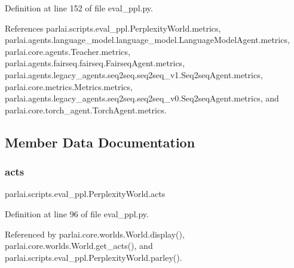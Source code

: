Definition at line 152 of file eval\+\_\+ppl.\+py.



References parlai.\+scripts.\+eval\+\_\+ppl.\+Perplexity\+World.\+metrics, parlai.\+agents.\+language\+\_\+model.\+language\+\_\+model.\+Language\+Model\+Agent.\+metrics, parlai.\+core.\+agents.\+Teacher.\+metrics, parlai.\+agents.\+fairseq.\+fairseq.\+Fairseq\+Agent.\+metrics, parlai.\+agents.\+legacy\+\_\+agents.\+seq2seq.\+seq2seq\+\_\+v1.\+Seq2seq\+Agent.\+metrics, parlai.\+core.\+metrics.\+Metrics.\+metrics, parlai.\+agents.\+legacy\+\_\+agents.\+seq2seq.\+seq2seq\+\_\+v0.\+Seq2seq\+Agent.\+metrics, and parlai.\+core.\+torch\+\_\+agent.\+Torch\+Agent.\+metrics.



\subsection{Member Data Documentation}
\mbox{\label{classparlai_1_1scripts_1_1eval__ppl_1_1PerplexityWorld_a6dc6a22aeefb747f50fd2f861667b1f3}} 
\subsubsection{\texorpdfstring{acts}{acts}}
{\footnotesize\ttfamily parlai.\+scripts.\+eval\+\_\+ppl.\+Perplexity\+World.\+acts}



Definition at line 96 of file eval\+\_\+ppl.\+py.



Referenced by parlai.\+core.\+worlds.\+World.\+display(), parlai.\+core.\+worlds.\+World.\+get\+\_\+acts(), and parlai.\+scripts.\+eval\+\_\+ppl.\+Perplexity\+World.\+parley().

\mbox{\label{classparlai_1_1scripts_1_1eval__ppl_1_1PerplexityWorld_ad1145d0be0d157d7cbfee7664cf1dd48}} 
